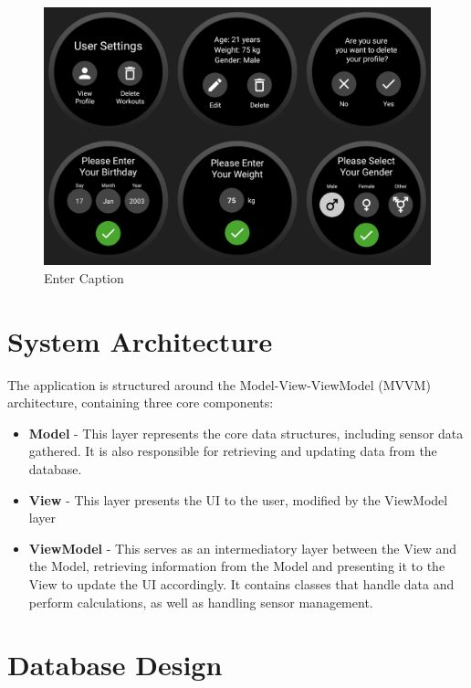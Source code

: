 \documentclass{l4proj}
\begin{document}
\begin{figure}[h!]
    \centering
    \includegraphics[width=1\linewidth]{dissertation//dissImages/UserSettingsCombined.png}
    \caption{Enter Caption}
    \label{fig:enter-label}
\end{figure}

\section{System Architecture}

The application is structured around the Model-View-ViewModel (MVVM) architecture, containing three core components:

\begin{itemize}
    \item \textbf{Model} - This layer represents the core data structures, including sensor data gathered. It is also responsible for retrieving and updating data from the database.
    \item \textbf{View} - This layer presents the UI to the user, modified by the ViewModel layer
    \item \textbf{ViewModel} - This serves as an intermediatory layer between the View and the Model, retrieving information from the Model and presenting it to the View to update the UI accordingly. It contains classes that handle data and perform calculations, as well as handling sensor management.
\end{itemize}

\section{Database Design}
\end{document}
